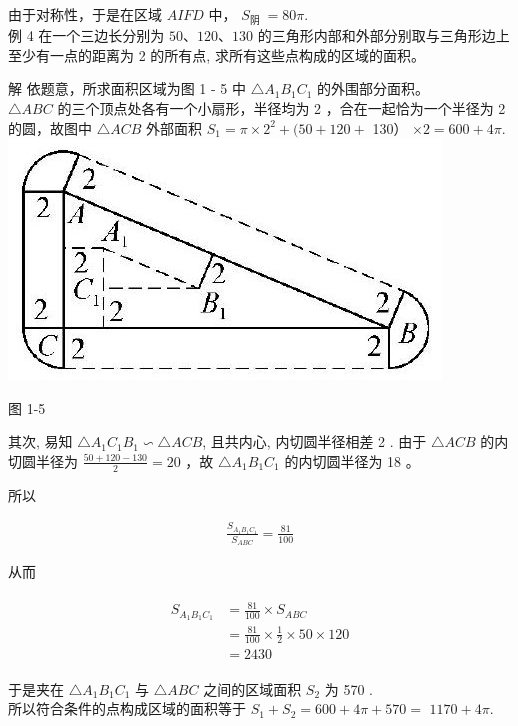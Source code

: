 \documentclass[10pt]{article}
\begin{document}
由于对称性，于是在区域 $A I F D$ 中， $S_{\text {阴 }}=80 \pi$.\\
例 4 在一个三边长分别为 $50 、 120 、 130$ 的三角形内部和外部分别取与三角形边上至少有一点的距离为 2 的所有点, 求所有这些点构成的区域的面积。

解 依题意，所求面积区域为图 1 - 5 中 $\triangle A_{1} B_{1} C_{1}$ 的外围部分面积。\\
$\triangle A B C$ 的三个顶点处各有一个小扇形，半径均为 2 ，合在一起恰为一个半径为 2 的圆，故图中 $\triangle A C B$ 外部面积 $S_{1}=\pi \times 2^{2}+(50+120+$ 130） $\times 2=600+4 \pi$.\\
\includegraphics[max width=\textwidth, center]{2024_10_30_66b8e5e701da2093c133g-013}

图 1-5

其次, 易知 $\triangle A_{1} C_{1} B_{1} \backsim \triangle A C B$, 且共内心, 内切圆半径相差 2 . 由于 $\triangle A C B$ 的内切圆半径为 $\frac{50+120-130}{2}=20$ ，故 $\triangle A_{1} B_{1} C_{1}$ 的内切圆半径为 18 。

所以

\begin{align*}
\frac{S_{A_{1} B_{1} C_{1}}}{S_{A B C}}=\frac{81}{100}
\end{align*}

从而

\begin{align*}
\begin{aligned}
S_{A_{1} B_{1} C_{1}} & =\frac{81}{100} \times S_{A B C} \\
& =\frac{81}{100} \times \frac{1}{2} \times 50 \times 120 \\
& =2430
\end{aligned}
\end{align*}

于是夹在 $\triangle A_{1} B_{1} C_{1}$ 与 $\triangle A B C$ 之间的区域面积 $S_{2}$ 为 570 .\\
所以符合条件的点构成区域的面积等于 $S_{1}+S_{2}=600+4 \pi+570=$ $1170+4 \pi$.
\end{document}
